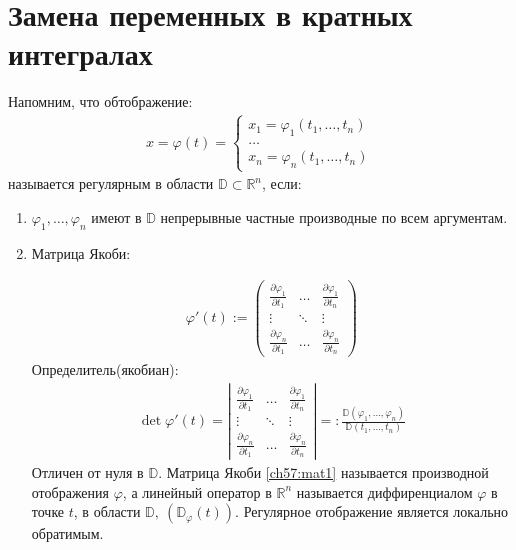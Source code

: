 \section{Замена переменных в кратных интегралах}
Напомним, что обтображение:
\begin{gather*}
  x = \varphi(t) =
  \begin{cases}
    x_1 = \varphi_1(t_1, \dots, t_n) \\
    \dots \\
    x_n = \varphi_n(t_1, \dots, t_n)
  \end{cases}
\end{gather*}
называется регулярным в области $\mathbb{D} \subset \mathbb{R}^n$, если:
\begin{enumerate}
  \item $\varphi_1, \dots, \varphi_n$ имеют в $\mathbb{D}$ непрерывные частные
    производные по всем аргументам.
  \item Матрица Якоби:

    \begin{gather}
      \varphi'(t) :=
      \begin{pmatrix}
        \frac{\partial \varphi_1}{\partial t_1} & \dots & \frac{\partial
        \varphi_1}{\partial t_n} \\
        \vdots & \ddots & \vdots \\
        \frac{\partial \varphi_n}{\partial t_1} & \dots & \frac{\partial
        \varphi_n}{\partial t_n}
      \end{pmatrix}
      \label{ch57:mat1}
    \end{gather}
    Определитель(якобиан):
    \begin{gather*}
      \det \varphi'(t) =
      \left|
      \begin{matrix}
        \frac{\partial \varphi_1}{\partial t_1} & \dots & \frac{\partial
        \varphi_1}{\partial t_n} \\
        \vdots & \ddots & \vdots \\
        \frac{\partial \varphi_n}{\partial t_1} & \dots & \frac{\partial
        \varphi_n}{\partial t_n}
      \end{matrix}
      \right|
      =: \frac{\mathbb{D}(\varphi_1, \dots, \varphi_n)}{\mathbb{D}(t_1, \dots,
      t_n)}
    \end{gather*}
    Отличен от нуля в $\mathbb{D}$.
    Матрица Якоби \eqref{ch57:mat1} называется производной отображения
    $\varphi$, а линейный оператор в $\mathbb{R}^n$ называется диффиренциалом
    $\varphi$ в точке $t$, в области $\mathbb{D}, \ (\mathbb{D}_\varphi(t))$.
    Регулярное отображение является локально обратимым.
\end{enumerate}
